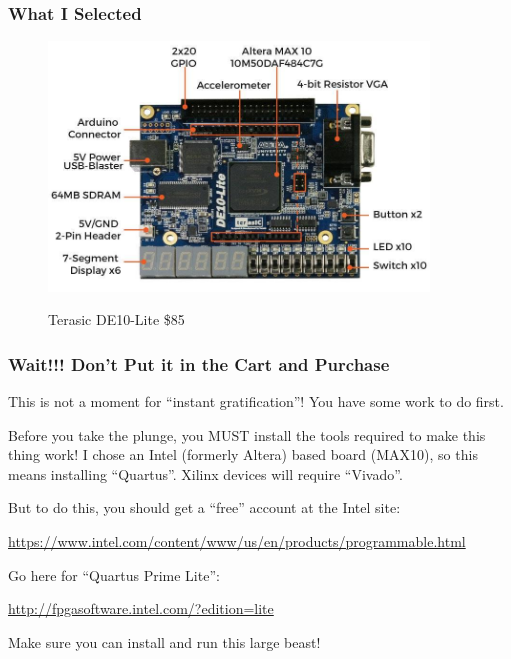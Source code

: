 \documentclass{beamer}
\begin{document}
\begin{frame}
\frametitle{What I Selected}

\begin{figure}[h]
	\centering
	\includegraphics[width=0.9\textwidth]{graphics/de10-lite.jpg}
	\centering\bfseries
	\caption{Terasic DE10-Lite \$85}
\end{figure}

\end{frame}

\begin{frame}
\frametitle{Wait!!! Don't Put it in the Cart and Purchase}

This is not a moment for ``instant gratification''!  You have some work to do first.

Before you take the plunge, you MUST install the tools required to make this thing work!
I chose an Intel (formerly Altera) based board (MAX10), so this means installing ``Quartus''.  Xilinx devices will require ``Vivado''.

But to do this, you should get a ``free'' account at the Intel site:

\url{https://www.intel.com/content/www/us/en/products/programmable.html}

Go here for ``Quartus Prime Lite'':

\url{http://fpgasoftware.intel.com/?edition=lite}

Make sure you can install and run this large beast!

\end{frame}
\end{document}
